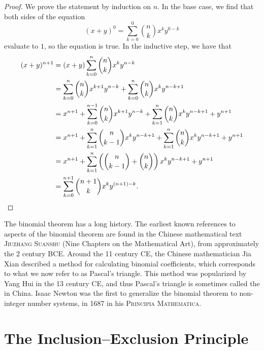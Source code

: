 \begin{proof}
  We prove the statement by induction on $n$. In the base case, we find that both sides of the equation
  \begin{equation*}
    (x+y)^0=\sum_{k=0}^0 \binom{n}{k}x^ky^{0-k}
  \end{equation*}
  evaluate to $1$, so the equation is true. In the inductive step, we have that
  \begin{align*}
    (x+y)^{n+1} & =(x+y)\sum_{k=0}^n \binom{n}{k}x^ky^{n-k} \\
                & = \sum_{k=0}^n \binom{n}{k}x^{k+1}y^{n-k} + \sum_{k=0}^n\binom{n}{k}x^ky^{n-k+1} \\
                & = x^{n+1} + \sum_{k=0}^{n-1} \binom{n}{k}x^{k+1}y^{n-k} + \sum_{k=1}^n\binom{n}{k}x^ky^{n-k+1} + y^{n+1} \\
                & = x^{n+1} + \sum_{k=1}^{n} \binom{n}{k-1}x^{k}y^{n-k+1} + \sum_{k=1}^n\binom{n}{k}x^ky^{n-k+1} + y^{n+1} \\
                & = x^{n+1} + \sum_{k=1}^n \left(\binom{n}{k-1}+\binom{n}{k}\right)x^ky^{n-k+1}+y^{n+1} \\
    & = \sum_{k=0}^{n+1} \binom{n+1}{k}x^ky^{(n+1)-k}.\qedhere
  \end{align*}
\end{proof}

The binomial theorem has a long history. The earliest known references to aspects of the binomial theorem are found in the Chinese mathematical text \textsc{Jiuzhang Suanshu} (Nine Chapters on the Mathematical Art), from approximately the 2\supnd{} century BCE. Around the 11\supth{} century CE, the Chinese mathematician Jia Xian described a method for calculating binomial coefficients, which corresponds to what we now refer to as Pascal’s triangle. This method was popularized by Yang Hui in the 13\supth{} century CE, and thus Pascal’s triangle is sometimes called the  in China. Isaac Newton was the first to generalize the binomial theorem to non-integer number systems, in 1687 in his \textsc{Principia Mathematica}.

\section{The Inclusion--Exclusion Principle}

